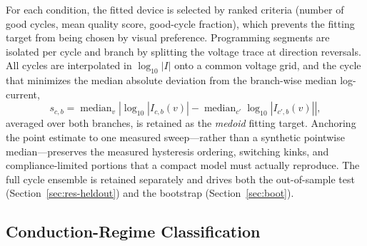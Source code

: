 \documentclass[journal]{IEEEtran}
\begin{document}
For each condition, the fitted device is selected by ranked criteria (number
of good cycles, mean quality score, good-cycle fraction), which prevents the
fitting target from being chosen by visual preference.  Programming segments
are isolated per cycle and branch by splitting the voltage trace at direction
reversals.  All cycles are interpolated in $\log_{10}|I|$ onto a common
voltage grid, and the cycle that minimizes the median absolute deviation
from the branch-wise median log-current,
\begin{equation}
  s_{c,b} =
  \operatorname{median}_{v}\left|
  \log_{10}|I_{c,b}(v)| -
  \operatorname{median}_{c'}\log_{10}|I_{c',b}(v)|
  \right|,
  \label{eq:medoid-score}
\end{equation}
averaged over both branches, is retained as the \emph{medoid} fitting target.
Anchoring the point estimate to one measured sweep---rather than a synthetic
pointwise median---preserves the measured hysteresis ordering, switching
kinks, and compliance-limited portions that a compact model must actually
reproduce.  The full cycle ensemble is retained separately and drives both
the out-of-sample test (Section~\ref{sec:res-heldout}) and the bootstrap
(Section~\ref{sec:boot}).

\subsection{Conduction-Regime Classification}
\label{sec:regimes}
\end{document}
